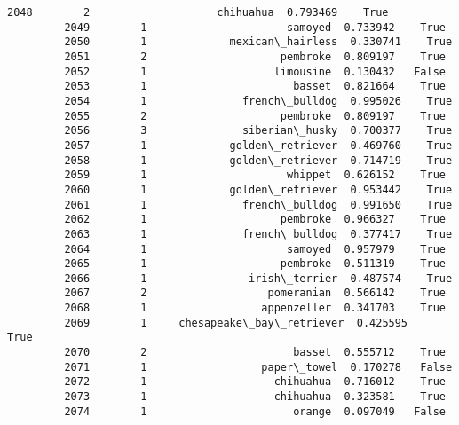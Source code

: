 \documentclass[11pt]{article}
\begin{document}
\begin{Verbatim}[commandchars=\\\{\}]
         2048        2                    chihuahua  0.793469    True   
         2049        1                      samoyed  0.733942    True   
         2050        1             mexican\_hairless  0.330741    True   
         2051        2                     pembroke  0.809197    True   
         2052        1                    limousine  0.130432   False   
         2053        1                       basset  0.821664    True   
         2054        1               french\_bulldog  0.995026    True   
         2055        2                     pembroke  0.809197    True   
         2056        3               siberian\_husky  0.700377    True   
         2057        1             golden\_retriever  0.469760    True   
         2058        1             golden\_retriever  0.714719    True   
         2059        1                      whippet  0.626152    True   
         2060        1             golden\_retriever  0.953442    True   
         2061        1               french\_bulldog  0.991650    True   
         2062        1                     pembroke  0.966327    True   
         2063        1               french\_bulldog  0.377417    True   
         2064        1                      samoyed  0.957979    True   
         2065        1                     pembroke  0.511319    True   
         2066        1                irish\_terrier  0.487574    True   
         2067        2                   pomeranian  0.566142    True   
         2068        1                  appenzeller  0.341703    True   
         2069        1     chesapeake\_bay\_retriever  0.425595    True   
         2070        2                       basset  0.555712    True   
         2071        1                  paper\_towel  0.170278   False   
         2072        1                    chihuahua  0.716012    True   
         2073        1                    chihuahua  0.323581    True   
         2074        1                       orange  0.097049   False   
         

\end{Verbatim}
\end{document}
